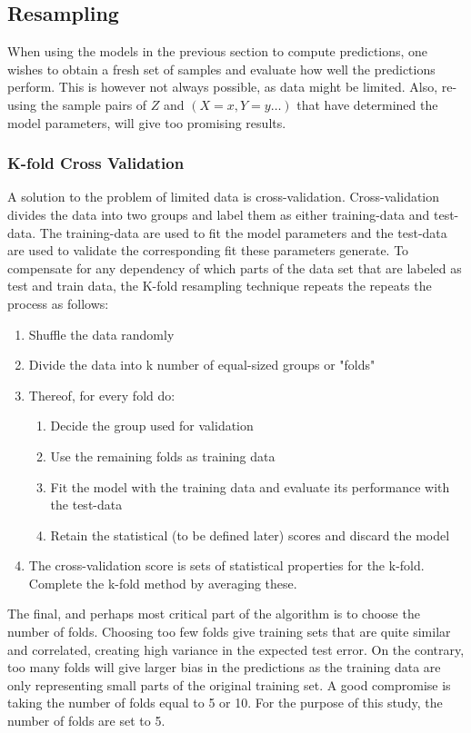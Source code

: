 \documentclass[...,numrefs]{wiley-article}
\begin{document}
\subsection{Resampling}
When using the models in the previous section to compute predictions, one wishes to obtain a fresh set of samples and evaluate how well the predictions perform. This is however not always possible, as data might be limited. Also, re-using the sample pairs of $Z$ and $(X = x, Y = y \dots)$ that have determined the model parameters, will give too promising results.


\subsubsection{K-fold Cross Validation}
A solution to the problem of limited data is cross-validation. Cross-validation divides the data into two groups and label them as either training-data and test-data. The training-data are used to fit the model parameters and the test-data are used to validate the corresponding fit these parameters generate. To compensate for any dependency of which parts of the data set that are labeled as test and train data, the K-fold resampling technique repeats the repeats the process as follows:

\begin{enumerate}
    \item Shuffle the data randomly 
    \item Divide the data into k number of equal-sized groups or "folds"
    \item Thereof, for every fold do:
    \begin{enumerate}
        \item Decide the group used for validation 
        \item Use the remaining folds as training data 
        \item Fit the model with the training data and evaluate its performance with the test-data
        \item Retain the statistical (to be defined later) scores and discard the model
        \end{enumerate}
    \item The cross-validation score is sets of statistical properties for the k-fold. Complete the k-fold method by averaging these. 
\end{enumerate}
    
The final, and perhaps most critical part of the algorithm is to choose the number of folds. Choosing too few folds give training sets that are quite similar and correlated, creating high variance in the expected test error. On the contrary, too many folds will give larger bias in the predictions as the training data are only representing small parts of the original training set. A good compromise is taking the number of folds equal to 5 or 10. For the purpose of this study, the number of folds are set to 5. 
\end{document}
